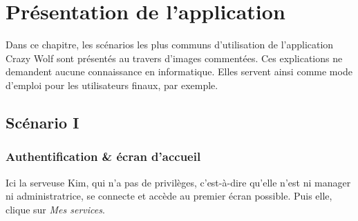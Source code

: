 \chapter[L'application]{Présentation de l'application}

Dans ce chapitre, les scénarios les plus communs
 d'utilisation de l'application Crazy Wolf sont 
 présentés au travers d'images commentées. Ces explications ne demandent aucune connaissance en informatique. Elles servent ainsi comme mode d'emploi pour les utilisateurs finaux, par exemple.

\section[Authentification \& écran d'accueil - Scénario I]{Scénario I}
\subsection*{Authentification \& écran d'accueil}
Ici la serveuse Kim, qui n'a pas de privilèges, c'est-à-dire qu'elle n'est 
ni manager ni administratrice, se connecte et accède au premier écran possible.
Puis elle, clique sur \textit{Mes services}.

